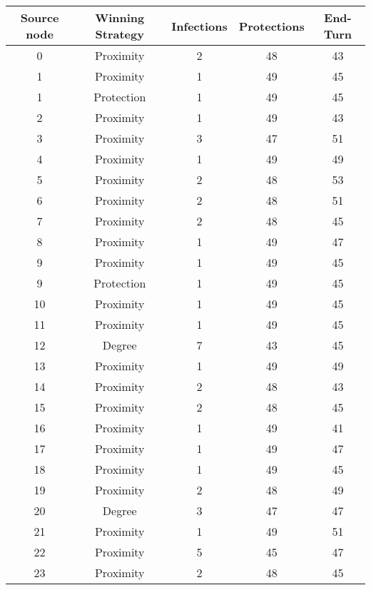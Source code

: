 \documentclass[results.tex]{subfiles}
\begin{document}
\begin{center}
  \begin{tabular}{| c || c | c | c | c |}
    \hline
    {\bfseries Source node} & {\bfseries Winning Strategy} & {\bfseries Infections} & {\bfseries Protections} & {\bfseries End-Turn} \\  %
    \hline\hline
    0 & Proximity & 2 & 48 & 43 \\ 
    \hline
    1 & Proximity & 1 & 49 & 45 \\ 
    \hline
    1 & Protection & 1 & 49 & 45 \\ 
    \hline
    2 & Proximity & 1 & 49 & 43 \\ 
    \hline
    3 & Proximity & 3 & 47 & 51 \\ 
    \hline
    4 & Proximity & 1 & 49 & 49 \\ 
    \hline
    5 & Proximity & 2 & 48 & 53 \\ 
    \hline
    6 & Proximity & 2 & 48 & 51 \\ 
    \hline
    7 & Proximity & 2 & 48 & 45 \\ 
    \hline
    8 & Proximity & 1 & 49 & 47 \\ 
    \hline
    9 & Proximity & 1 & 49 & 45 \\ 
    \hline
    9 & Protection & 1 & 49 & 45 \\ 
    \hline
    10 & Proximity & 1 & 49 & 45 \\ 
    \hline
    11 & Proximity & 1 & 49 & 45 \\ 
    \hline
    12 & Degree & 7 & 43 & 45 \\ 
    \hline
    13 & Proximity & 1 & 49 & 49 \\ 
    \hline
    14 & Proximity & 2 & 48 & 43 \\ 
    \hline
    15 & Proximity & 2 & 48 & 45 \\ 
    \hline
    16 & Proximity & 1 & 49 & 41 \\ 
    \hline
    17 & Proximity & 1 & 49 & 47 \\ 
    \hline
    18 & Proximity & 1 & 49 & 45 \\ 
    \hline
    19 & Proximity & 2 & 48 & 49 \\ 
    \hline
    20 & Degree & 3 & 47 & 47 \\ 
    \hline
    21 & Proximity & 1 & 49 & 51 \\ 
    \hline
    22 & Proximity & 5 & 45 & 47 \\ 
    \hline
    23 & Proximity & 2 & 48 & 45 \\ 

\end{tabular}
\end{center}
\end{document}
